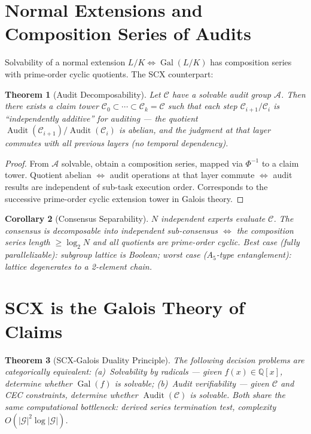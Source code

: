 \documentclass[10pt,a4paper]{article}
\newtheorem{theorem}{Theorem}[section]
\newtheorem{corollary}[theorem]{Corollary}
\theoremstyle{remark}
\DeclareMathOperator{\Gal}{Gal}
\DeclareMathOperator{\Audit}{Audit}
\newcommand{\Q}{\mathbb{Q}}
\newcommand{\A}{\mathcal{A}}
\newcommand{\G}{\mathcal{G}}
\newcommand{\cC}{\mathcal{C}}
\begin{document}
\section{Normal Extensions and Composition Series of Audits}

Solvability of a normal extension $L/K \iff \Gal(L/K)$ has composition series with prime-order cyclic quotients. The SCX counterpart:

\begin{theorem}[Audit Decomposability]\label{thm:decomposability}
Let $\cC$ have a solvable audit group $\A$. Then there exists a claim tower $\cC_0\subset\cdots\subset\cC_k=\cC$ such that each step $\cC_{i+1}/\cC_i$ is ``independently additive'' for auditing — the quotient $\Audit(\cC_{i+1})/\Audit(\cC_i)$ is abelian, and the judgment at that layer commutes with all previous layers (no temporal dependency).
\end{theorem}

\begin{proof}
From $\A$ solvable, obtain a composition series, mapped via $\Phi^{-1}$ to a claim tower. Quotient abelian $\iff$ audit operations at that layer commute $\iff$ audit results are independent of sub-task execution order. Corresponds to the successive prime-order cyclic extension tower in Galois theory.
\end{proof}

\begin{corollary}[Consensus Separability]\label{cor:separability}
$N$ independent experts evaluate $\cC$. The consensus is decomposable into independent sub-consensus $\iff$ the composition series length $\ge\log_2 N$ and all quotients are prime-order cyclic. Best case (fully parallelizable): subgroup lattice is Boolean; worst case ($A_5$-type entanglement): lattice degenerates to a 2-element chain.
\end{corollary}

\section{SCX is the Galois Theory of Claims}

\begin{theorem}[SCX-Galois Duality Principle]\label{thm:meta}
The following decision problems are categorically equivalent: (a)~Solvability by radicals — given $f(x)\in\Q[x]$, determine whether $\Gal(f)$ is solvable; (b)~Audit verifiability — given $\cC$ and CEC constraints, determine whether $\Audit(\cC)$ is solvable. Both share the same computational bottleneck: derived series termination test, complexity $O(|\G|^2\log|\G|)$.
\end{theorem}
\end{document}
